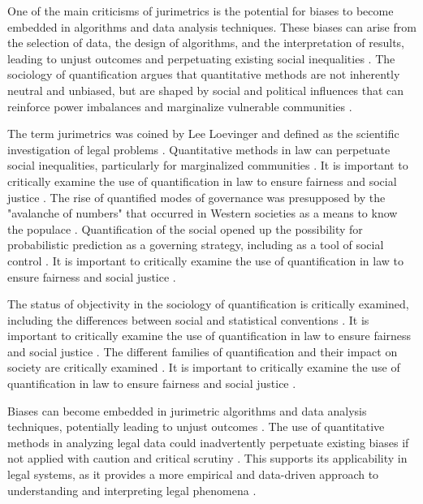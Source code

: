 One of the main criticisms of jurimetrics is the potential for biases to become embedded in algorithms and data analysis techniques. These biases can arise from the selection of data, the design of algorithms, and the interpretation of results, leading to unjust outcomes and perpetuating existing social inequalities \cite{10.1590/dados.2022.65.3.267,1023071190721}. The sociology of quantification argues that quantitative methods are not inherently neutral and unbiased, but are shaped by social and political influences that can reinforce power imbalances and marginalize vulnerable communities \cite{10.1590/dados.2022.65.3.267,1023071190721}.

The term jurimetrics was coined by Lee Loevinger and defined as the scientific investigation of legal problems \cite{ribeiro2021quantification}. Quantitative methods in law can perpetuate social inequalities, particularly for marginalized communities \cite{ribeiro2021quantification}. It is important to critically examine the use of quantification in law to ensure fairness and social justice \cite{ribeiro2021quantification}. The rise of quantified modes of governance was presupposed by the "avalanche of numbers" that occurred in Western societies as a means to know the populace \cite{101111lsi12334}. Quantification of the social opened up the possibility for probabilistic prediction as a governing strategy, including as a tool of social control \cite{101111lsi12334}. It is important to critically examine the use of quantification in law to ensure fairness and social justice \cite{101111lsi12334}.

The status of objectivity in the sociology of quantification is critically examined, including the differences between social and statistical conventions \cite{salais2016}. It is important to critically examine the use of quantification in law to ensure fairness and social justice \cite{salais2016}. The different families of quantification and their impact on society are critically examined \cite{101007s1102402209481w}. It is important to critically examine the use of quantification in law to ensure fairness and social justice \cite{101007s1102402209481w}.

Biases can become embedded in jurimetric algorithms and data analysis techniques, potentially leading to unjust outcomes \cite{10.1057/s41599-020-00557-0,10.5040/9781350220645}. The use of quantitative methods in analyzing legal data could inadvertently perpetuate existing biases if not applied with caution and critical scrutiny \cite{10.1057/s41599-020-00557-0,10.5040/9781350220645}. This supports its applicability in legal systems, as it provides a more empirical and data-driven approach to understanding and interpreting legal phenomena \cite{10.1057/s41599-020-00557-0,10.5040/9781350220645}.

